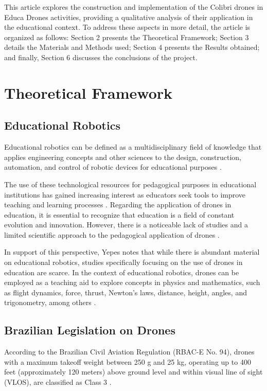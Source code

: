 \documentclass[conference]{IEEEtran}
\begin{document}
This article explores the construction and implementation of the Colibri drones in Educa Drones activities, providing a qualitative analysis of their application in the educational context. To address these aspects in more detail, the article is organized as follows: Section 2 presents the Theoretical Framework; Section 3 details the Materials and Methods used; Section 4 presents the Results obtained; and finally, Section 6 discusses the conclusions of the project.

\section{Theoretical Framework}

\subsection{Educational Robotics}

Educational robotics can be defined as a multidisciplinary field of knowledge that applies engineering concepts and other sciences to the design, construction, automation, and control of robotic devices for educational purposes \cite{b1}.

The use of these technological resources for pedagogical purposes in educational institutions has gained increasing interest as educators seek tools to improve teaching and learning processes \cite{b12}. Regarding the application of drones in education, it is essential to recognize that education is a field of constant evolution and innovation. However, there is a noticeable lack of studies and a limited scientific approach to the pedagogical application of drones \cite{b9}.

In support of this perspective, Yepes \cite{b11} notes that while there is abundant material on educational robotics, studies specifically focusing on the use of drones in education are scarce. In the context of educational robotics, drones can be employed as a teaching aid to explore concepts in physics and mathematics, such as flight dynamics, force, thrust, Newton's laws, distance, height, angles, and trigonometry, among others \cite{b11}.

\subsection{Brazilian Legislation on Drones}

According to the Brazilian Civil Aviation Regulation (RBAC-E No. 94), drones with a maximum takeoff weight between 250 g and 25 kg, operating up to 400 feet (approximately 120 meters) above ground level and within visual line of sight (VLOS), are classified as Class 3 \cite{b2}.
\end{document}
